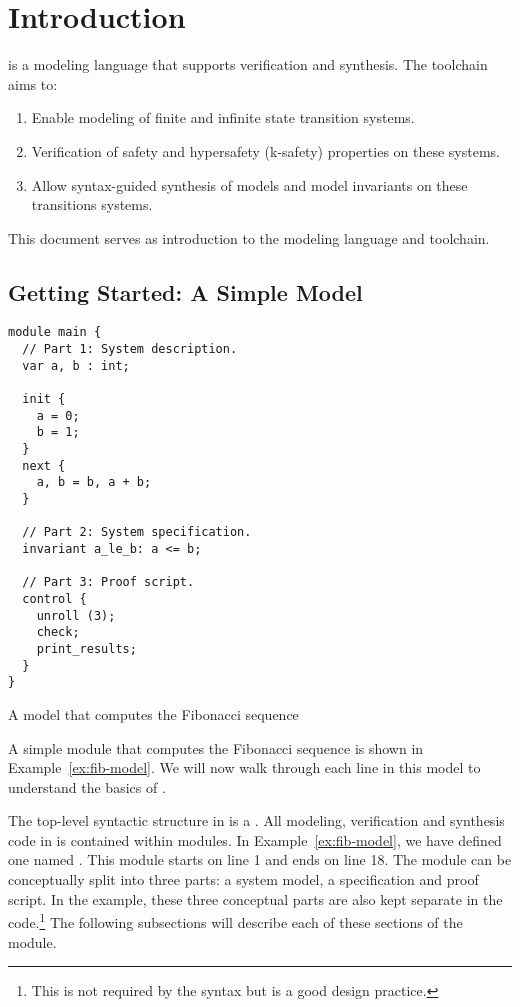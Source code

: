 \chapter{Introduction}

\uclid{} is a modeling language that supports verification and synthesis. The \uclid{} toolchain aims to:
\begin{enumerate}
\item Enable modeling of finite and infinite state transition systems.
\item Verification of safety and hypersafety (k-safety) properties on these systems.
\item Allow syntax-guided synthesis of models and model invariants on these transitions systems.
\end{enumerate}

This document serves as introduction to the \uclid{} modeling language and toolchain.

\section{Getting Started: A Simple \uclid{} Model}

\begin{uclidlisting}[htbp]
\begin{lstlisting}[language=uclid,style=uclidstyle]
module main {
  // Part 1: System description.
  var a, b : int;

  init {
    a = 0;
    b = 1;
  }
  next {
    a, b = b, a + b;
  }

  // Part 2: System specification.
  invariant a_le_b: a <= b;

  // Part 3: Proof script.
  control {
    unroll (3);
    check;
    print_results;
  }
}
\end{lstlisting}
\label{ex:fib-model}
\caption{A \uclid{} model that computes the Fibonacci sequence}
\end{uclidlisting}

A simple \uclid{} module that computes the Fibonacci sequence is shown in Example~\ref{ex:fib-model}.  We will now walk through each line in this model to understand the basics of \uclid{}.

The top-level syntactic structure in \uclid{} is a . All modeling, verification and synthesis code in \uclid{} is contained within modules. In Example~\ref{ex:fib-model}, we have defined one  named . This module starts on line 1 and ends on line 18. The module can be conceptually split into three parts: a system model, a specification and proof script. In the example, these three conceptual parts are also kept separate in the code.\footnote{This is not required by the \uclid{} syntax but is a good design practice.} The following subsections will describe each of these sections of the module. 

